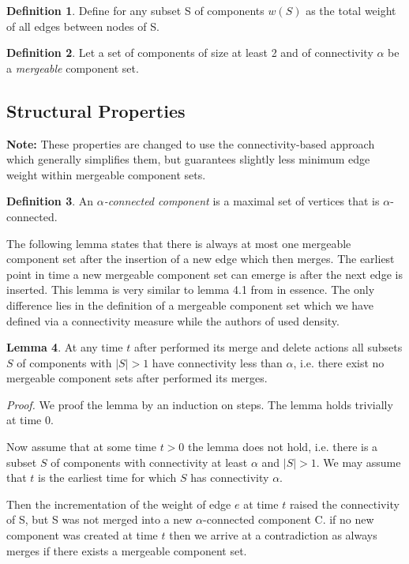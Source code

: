 \documentclass[a4paper,xcolor=dvipsnames, tikz, 12pt]{article}
\newcommand{\crep}{\text{C{\scriptsize REP}}}
\theoremstyle{definition}
\newtheorem{defi}{Definition}
\newtheorem{lemma}[defi]{Lemma}
\begin{document}
\begin{defi}
	Define for any subset S of components $w(S)$ as the total weight of all edges between nodes of S.
\end{defi}

\begin{defi}
	Let a set of components of size at least 2 and of connectivity $\alpha$ be a \textit{mergeable} component set.	
\end{defi}


\subsection{Structural Properties}


\textbf{Note:} These properties are changed to use the connectivity-based approach which generally simplifies them, but guarantees slightly less minimum edge weight within mergeable component sets.
\begin{defi}
	An $\alpha$\textit{-connected component} is a maximal set of vertices that is $\alpha$-connected.
\end{defi}

The following lemma states that there is always at most one mergeable component set after the insertion of a new edge which \crep{} then merges. The earliest point in time a new mergeable component set can emerge is after the next edge is inserted. This lemma is very similar to lemma 4.1 from \cite{Avin2015} in essence. The only difference lies in the definition of a mergeable component set which we have defined via a connectivity measure while the authors of \cite{Avin2015} used density.

\begin{lemma}
	\label{mergeableLemma}
	At any time $t$ after \crep{} performed its merge and delete actions all subsets $S$ of components with $|S|>1$ have connectivity less than $\alpha$, i.e. there exist no mergeable component sets after \crep{} performed its merges.
\end{lemma}

\textit{Proof.} We proof the lemma by an induction on steps. The lemma holds trivially at time 0.

Now assume that at some time $t>0$ the lemma does not hold, i.e. there is a subset $S$ of components with connectivity at least $\alpha$ and $|S|>1$. We may assume that $t$ is the earliest time for which $S$ has connectivity $\alpha$.

Then the incrementation of the weight of edge $e$ at time $t$ raised the connectivity of S, but S was not merged into a new $\alpha$-connected component C. if no new component was created at time $t$ then we arrive at a contradiction as \crep{} always merges if there exists a mergeable component set.
\end{document}
